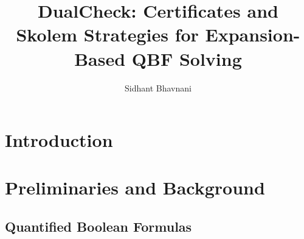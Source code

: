 \documentclass[runningheads]{llncs}
\newcommand{\ExpRes}{\forall\text{-}\mathrm{Exp}\text{+}\mathrm{Res}}
\newcommand{\PG}{\mathrm{PG}}
\begin{document}
\title{DualCheck: Certificates and Skolem Strategies for Expansion-Based QBF Solving}

\author{Sidhant Bhavnani}


\maketitle

\begin{abstract}
\end{abstract}

\section{Introduction}
\label{sec:intro}

\section{Preliminaries and Background}
\label{sec:preliminaries}


\subsection{Quantified Boolean Formulas}
\label{subsec:qbf}
\end{document}
